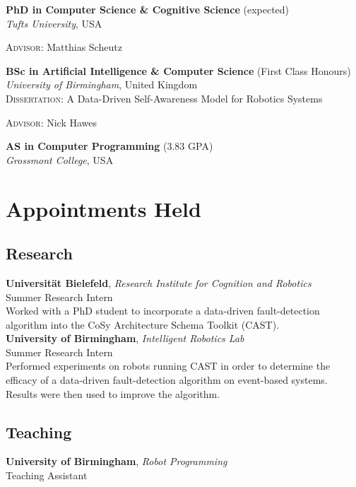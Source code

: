 \documentclass[10pt, a4paper]{article}
\newcommand{\years}[1]{\marginnote{\scriptsize #1}}
\begin{document}
\years{2017}
\textbf{PhD in Computer Science \& Cognitive Science} (expected)\\
\textsl{Tufts University}, USA\\
\small{\textsc{Advisor:} Matthias Scheutz
\vspace{.25cm}

\years{2012}
\textbf{BSc in Artificial Intelligence \& Computer Science} (First Class Honours)\\
\textsl{University of Birmingham}, United Kingdom\\
\small{\textsc{Dissertation:} A Data-Driven Self-Awareness Model for Robotics Systems}\\
\small{\textsc{Advisor:} Nick Hawes
\vspace{.25cm}

\years{2009}
\textbf{AS in Computer Programming} (3.83 GPA)\\
\textit{Grossmont College}, USA\\

\section*{Appointments Held}
\subsection{Research}
\years{2011}
\textbf{Universität Bielefeld}, \textsl{Research Institute for Cognition and Robotics}\\
Summer Research Intern\\[.2cm]
Worked with a PhD student to incorporate a data-driven fault-detection algorithm into the CoSy Architecture Schema Toolkit (CAST).\\[.2cm]
\textbf{University of Birmingham}, \textsl{Intelligent Robotics Lab}\\
Summer Research Intern\\[.2cm]
Performed experiments on robots running CAST in order to determine the efficacy of a data-driven fault-detection algorithm on event-based systems. Results were then used to improve the algorithm.\\[.25cm]

\subsection{Teaching}
\years{2012}
\textbf{University of Birmingham}, \textsl{Robot Programming}\\
Teaching Assistant


}}
\end{document}
